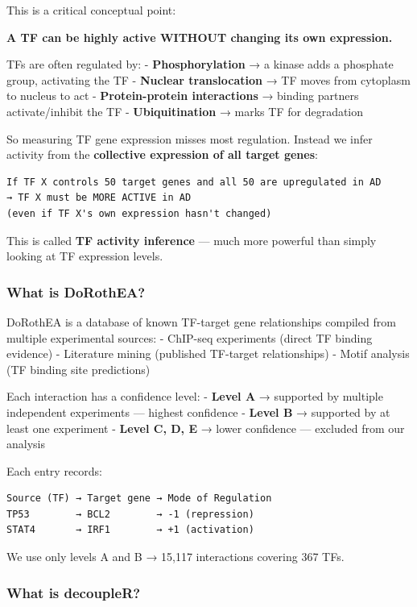 \documentclass[
]{article}
\begin{document}
This is a critical conceptual point:

\textbf{A TF can be highly active WITHOUT changing its own expression.}

TFs are often regulated by: - \textbf{Phosphorylation} → a kinase adds a
phosphate group, activating the TF - \textbf{Nuclear translocation} → TF
moves from cytoplasm to nucleus to act - \textbf{Protein-protein
interactions} → binding partners activate/inhibit the TF -
\textbf{Ubiquitination} → marks TF for degradation

So measuring TF gene expression misses most regulation. Instead we infer
activity from the \textbf{collective expression of all target genes}:

\begin{verbatim}
If TF X controls 50 target genes and all 50 are upregulated in AD
→ TF X must be MORE ACTIVE in AD
(even if TF X's own expression hasn't changed)
\end{verbatim}

This is called \textbf{TF activity inference} --- much more powerful
than simply looking at TF expression levels.

\subsubsection{What is DoRothEA?}\label{what-is-dorothea}

DoRothEA is a database of known TF-target gene relationships compiled
from multiple experimental sources: - ChIP-seq experiments (direct TF
binding evidence) - Literature mining (published TF-target
relationships) - Motif analysis (TF binding site predictions)

Each interaction has a confidence level: - \textbf{Level A} → supported
by multiple independent experiments --- highest confidence -
\textbf{Level B} → supported by at least one experiment - \textbf{Level
C, D, E} → lower confidence --- excluded from our analysis

Each entry records:

\begin{verbatim}
Source (TF) → Target gene → Mode of Regulation
TP53        → BCL2        → -1 (repression)
STAT4       → IRF1        → +1 (activation)
\end{verbatim}

We use only levels A and B → 15,117 interactions covering 367 TFs.

\subsubsection{What is decoupleR?}\label{what-is-decoupler}
\end{document}

